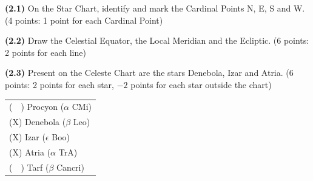 \textbf{(2.1)} On the Star Chart, identify and mark the Cardinal Points N, E,
S and W. \hfill(4 points: 1 point for each Cardinal Point)

\textbf{(2.2)} Draw the Celestial Equator, the Local Meridian and the
Ecliptic. \hfill(6 points: 2 points for each line)


\textbf{(2.3)} Present on the Celeste Chart are the stars Denebola, Izar and
Atria. %
\hfill(6 points: 2 points for each star, $-2$ points for each star outside
the chart)

\begin{center}
\begin{tabular}{l}
(\ \ ) Procyon ($\alpha$ CMi) \\
(X) Denebola ($\beta$ Leo) \\
(X) Izar ($\epsilon$ Boo) \\
(X) Atria ($\alpha$ TrA) \\
(\ \ ) Tarf ($\beta$ Cancri) \\
\end{tabular}
\end{center}
